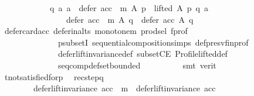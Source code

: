 \begin{isabellebody}
\ \ \ \ \ \ \ \ \ \ \ \ {\isacharparenleft}{\kern0pt}{\isasymforall}q\ a{\isachardot}{\kern0pt}\ {\isacharparenleft}{\kern0pt}a\ {\isasymin}\ {\isacharparenleft}{\kern0pt}defer\ {\isacharparenleft}{\kern0pt}acc\ {\isasymtriangleright}\ m{\isacharparenright}{\kern0pt}\ A\ p{\isacharparenright}{\kern0pt}\ {\isasymand}\ lifted\ A\ p\ q\ a{\isacharparenright}{\kern0pt}\ {\isasymlongrightarrow}\isanewline
\ \ \ \ \ \ \ \ \ \ \ \ \ \ \ \ defer\ {\isacharparenleft}{\kern0pt}acc\ {\isasymtriangleright}\ m{\isacharparenright}{\kern0pt}\ A\ q\ {\isasymsubset}\ defer\ acc\ A\ q{\isacharparenright}{\kern0pt}{\isachardoublequoteclose}\isanewline
\ \ \ \ \ \ \ \ \isamarkupfalse%
\ defer{\isacharunderscore}{\kern0pt}card{\isacharunderscore}{\kern0pt}acc\ defer{\isacharunderscore}{\kern0pt}in{\isacharunderscore}{\kern0pt}alts\ monotone{\isacharunderscore}{\kern0pt}m\ prod{\isachardot}{\kern0pt}sel{\isacharparenleft}{\kern0pt}{}{\isacharparenright}{\kern0pt}\ f{\isacharunderscore}{\kern0pt}prof\isanewline
\ \ \ \ \ \ \ \ \ \ \ \ \ \ psubsetI\ sequential{\isacharunderscore}{\kern0pt}composition{\isachardot}{\kern0pt}simps\ def{\isacharunderscore}{\kern0pt}presv{\isacharunderscore}{\kern0pt}fin{\isacharunderscore}{\kern0pt}prof\isanewline
\ \ \ \ \ \ \ \ \ \ \ \ \ \ defer{\isacharunderscore}{\kern0pt}lift{\isacharunderscore}{\kern0pt}invariance{\isacharunderscore}{\kern0pt}def\ subsetCE\ Profile{\isachardot}{\kern0pt}lifted{\isacharunderscore}{\kern0pt}def\isanewline
\ \ \ \ \ \ \ \ \ \ \ \ \ \ seq{\isacharunderscore}{\kern0pt}comp{\isacharunderscore}{\kern0pt}def{\isacharunderscore}{\kern0pt}set{\isacharunderscore}{\kern0pt}bounded\isanewline
\ \ \ \ \ \ \ \ \isamarkupfalse%
\ {\isacharparenleft}{\kern0pt}smt\ {\isacharparenleft}{\kern0pt}verit{\isacharparenright}{\kern0pt}{\isacharparenright}{\kern0pt}\isanewline
\ \ \ \ \ \ \isamarkupfalse%
\ t{\isacharunderscore}{\kern0pt}not{\isacharunderscore}{\kern0pt}satisfied{\isacharunderscore}{\kern0pt}for{\isacharunderscore}{\kern0pt}p\ \isamarkupfalse%
\ rec{\isacharunderscore}{\kern0pt}step{\isacharunderscore}{\kern0pt}q{\isacharcolon}{\kern0pt}\isanewline
\ \ \ \ \ \ \ \ {\isachardoublequoteopen}{\isacharparenleft}{\kern0pt}defer{\isacharunderscore}{\kern0pt}lift{\isacharunderscore}{\kern0pt}invariance\ {\isacharparenleft}{\kern0pt}acc\ {\isasymtriangleright}\ m{\isacharparenright}{\kern0pt}\ {\isasymand}\ defer{\isacharunderscore}{\kern0pt}lift{\isacharunderscore}{\kern0pt}invariance\ {\isacharparenleft}{\kern0pt}acc{\isacharparenright}{\kern0pt}{\isacharparenright}{\kern0pt}\ {\isasymlongrightarrow}\isanewline

\end{isabellebody}
